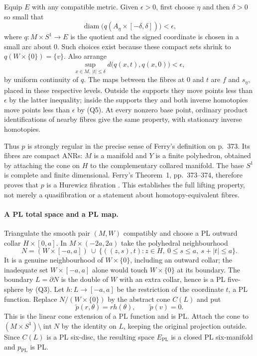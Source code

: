 \documentclass[11pt,a4paper]{article}
\theoremstyle{definition}
\begin{document}
Equip $E$ with any compatible metric.  Given $\epsilon>0$, first choose
$\eta$ and then $\delta>0$ so small that
\[
 \operatorname{diam}\bigl(q(A_\eta\times[-\delta,\delta])\bigr)<\epsilon,
 \tag{Q5}
\]
where $q:M\times S^1\to E$ is the quotient and the signed coordinate is
chosen in a small arc about $0$.  Such choices exist because these compact
sets shrink to $q(W\times\{0\})=\{v\}$.  Also arrange
\[
 \sup_{x\in M,\ |t|\le\delta}
    d\bigl(q(x,t),q(x,0)\bigr)<\epsilon,
\]
by uniform continuity of $q$.  The maps between the fibres at $0$ and $t$
are $f$ and $s_\eta$, placed in these respective levels.  Outside the
supports they move points less than $\epsilon$ by the latter inequality;
inside the supports they and both inverse homotopies move points less than
$\epsilon$ by (Q5).  At every nonzero base point, ordinary product
identifications of nearby fibres give the same property, with stationary
inverse homotopies.

Thus $p$ is strongly regular in the precise sense of Ferry's definition on
p.~373.  Its fibres are compact ANRs: $M$ is a manifold and $Y$ is a finite
polyhedron, obtained by attaching the cone on $H$ to the complementary
collared manifold.  The base $S^1$ is complete and finite dimensional.
Ferry's Theorem~1, pp.~373--374, therefore proves that $p$ is a Hurewicz
fibration \cite{Ferry}.  This establishes the full lifting property,
not merely a quasifibration or a statement about homotopy-equivalent fibres.

\paragraph{A PL total space and a PL map.}
Triangulate the smooth pair $(M,W)$ compatibly and choose a PL outward
collar $H\times[0,a]$.  In $M\times(-2a,2a)$ take the polyhedral
neighbourhood
\[
 N=(W\times[-a,a])\ \cup\
   \{((z,s),t):z\in H,\ 0\le s\le a,\ s+|t|\le a\}.
 \tag{Q6}
\]
It is a genuine neighbourhood of $W\times\{0\}$, including an outward
collar; the inadequate set $W\times[-a,a]$ alone would touch $W\times\{0\}$
at its boundary.  The boundary $L=\partial N$ is the double of $W$ with an
extra collar, hence is a PL five-sphere by (Q3).  Let
$h:L\to[-a,a]$ be the restriction of the coordinate $t$, a PL function.
Replace $N/(W\times\{0\})$ by the abstract cone $C(L)$ and put
\[
 \widetilde p(r,\theta)=r h(\theta),\qquad \widetilde p(v)=0.
 \tag{Q7}
\]
This is the linear cone extension of a PL function and is PL.  Attach the
cone to $(M\times S^1)\setminus\operatorname{int}N$ by the identity on $L$,
keeping the original projection outside.  Since $C(L)$ is a PL six-disc,
the resulting space $E_{\mathrm{PL}}$ is a closed PL six-manifold and
$p_{\mathrm{PL}}$ is PL.
\end{document}
